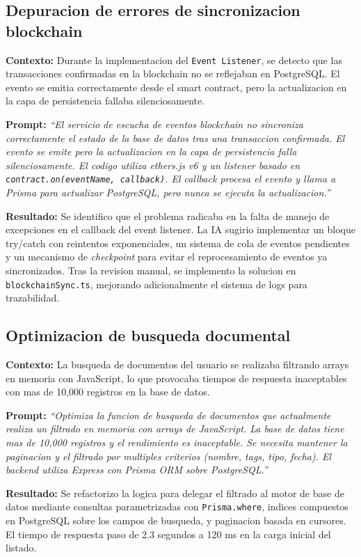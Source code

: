 \documentclass[11pt, a4paper]{article}
\begin{document}
\subsection{Depuracion de errores de sincronizacion blockchain}

\textbf{Contexto:} Durante la implementacion del \texttt{Event Listener}, se detecto que las transacciones confirmadas en la blockchain no se reflejaban en PostgreSQL. El evento se emitia correctamente desde el smart contract, pero la actualizacion en la capa de persistencia fallaba silenciosamente.

\textbf{Prompt:} \textit{``El servicio de escucha de eventos blockchain no sincroniza correctamente el estado de la base de datos tras una transaccion confirmada. El evento se emite pero la actualizacion en la capa de persistencia falla silenciosamente. El codigo utiliza ethers.js v6 y un listener basado en \texttt{contract.on(eventName, callback)}. El callback procesa el evento y llama a Prisma para actualizar PostgreSQL, pero nunca se ejecuta la actualizacion.''}

\textbf{Resultado:} Se identifico que el problema radicaba en la falta de manejo de excepciones en el callback del event listener. La IA sugirio implementar un bloque try/catch con reintentos exponenciales, un sistema de cola de eventos pendientes y un mecanismo de \textit{checkpoint} para evitar el reprocesamiento de eventos ya sincronizados. Tras la revision manual, se implemento la solucion en \texttt{blockchainSync.ts}, mejorando adicionalmente el sistema de logs para trazabilidad.

\subsection{Optimizacion de busqueda documental}

\textbf{Contexto:} La busqueda de documentos del usuario se realizaba filtrando arrays en memoria con JavaScript, lo que provocaba tiempos de respuesta inaceptables con mas de 10,000 registros en la base de datos.

\textbf{Prompt:} \textit{``Optimiza la funcion de busqueda de documentos que actualmente realiza un filtrado en memoria con arrays de JavaScript. La base de datos tiene mas de 10,000 registros y el rendimiento es inaceptable. Se necesita mantener la paginacion y el filtrado por multiples criterios (nombre, tags, tipo, fecha). El backend utiliza Express con Prisma ORM sobre PostgreSQL.''}

\textbf{Resultado:} Se refactorizo la logica para delegar el filtrado al motor de base de datos mediante consultas parametrizadas con \texttt{Prisma.where}, indices compuestos en PostgreSQL sobre los campos de busqueda, y paginacion basada en cursores. El tiempo de respuesta paso de 2.3 segundos a 120 ms en la carga inicial del listado.
\end{document}
